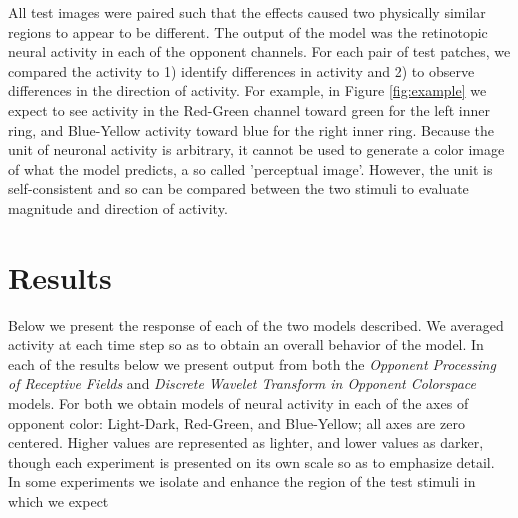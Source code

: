 \documentclass[journal,onecolumn]{IEEEtran}
\begin{document}
All test images were paired such that the effects caused two physically similar regions to appear to be different. The output of the model was the retinotopic neural activity in each of the opponent channels. For each pair of test patches, we compared the activity to 1) identify differences in activity and 2) to observe differences in the direction of activity. For example, in Figure \ref{fig:example} we expect to see activity in the Red-Green channel toward green for the left inner ring, and Blue-Yellow activity toward blue for the right inner ring. Because the unit of neuronal activity is arbitrary, it cannot be used to generate a color image of what the model predicts, a so called 'perceptual image'. However, the unit is self-consistent and so can be compared between the two stimuli to evaluate magnitude and direction of activity.


%
%
%
\section{Results}

Below we present the response of each of the two models described. We averaged activity at each time step so as to obtain an overall behavior of the model. In each of the results below we present output from both the \textit{Opponent Processing of Receptive Fields} and \textit{Discrete Wavelet Transform in Opponent Colorspace} models. For both we obtain models of neural activity in each of the axes of opponent color: Light-Dark, Red-Green, and Blue-Yellow; all axes are zero centered. Higher values are represented as lighter, and lower values as darker, though each experiment is presented on its own scale so as to emphasize detail.
In some experiments we isolate and enhance the region of the test stimuli in which we expect 

\newpage
\end{document}

